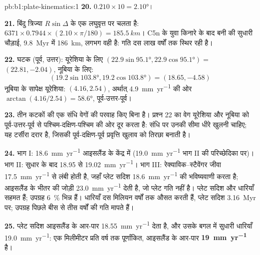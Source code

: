 \begin{solution}{pb:b1:plate-kinematics:1}
\textbf{20.} $0.210\times10 = \ang{2.10}$।

\textbf{21.} बिंदु त्रिज्या $R\sin\Delta$ के एक लघुवृत्त पर चलता है:
$6371\times0.7944\times(2.10\times\pi/180) = \qty{185.5}{km}$। C5n के युवा किनारे के बाद बनी  की सुधारी चौड़ाई, \qty{9.8}{Myr} में \qty{186}{km}, लगभग वही है: गति दस लाख वर्षों तक स्थिर रही है।

\textbf{22.} घटक (पूर्व, उत्तर): यूरेशिया के लिए
$(22.9\sin\ang{95.1}, 22.9\cos\ang{95.1}) =$ $(22.81, -2.04)$, नूबिया के लिए:
\[ (19.2\sin\ang{103.8}, 19.2\cos\ang{103.8}) = (18.65, -4.58) \]
नूबिया के सापेक्ष यूरेशिया: $(4.16, 2.54)$, अर्थात् \qty{4.9}{mm.yr^{-1}} की ओर
$\arctan(4.16/2.54) = \ang{58.6}$, पूर्व-उत्तर-पूर्व।

\textbf{23.} तीन कटकों की एक संधि वेगों की परवाह किए बिना  है। प्रश्न 22 का वेग यूरेशिया और नूबिया को पूर्व-उत्तर-पूर्व से पश्चिम-दक्षिण-पश्चिम की ओर दूर करता है: संधि पर उनकी सीमा धीरे खुलनी चाहिए; यह टर्सीरा दरार है, जिसकी पूर्व-दक्षिण-पूर्व प्रवृत्ति खुलाव को तिरछा बनाती है।

\textbf{24.} भाग I: \qty{18.6}{mm.yr^{-1}} आइसलैंड के केंद्र में
(\qty{19.0}{mm.yr^{-1}} भाग II की परिच्छेदिका पर)। भाग II: सुधार के बाद 18.95 से
\qty{19.02}{mm.yr^{-1}}। भाग III: रेक्याविक–स्टैवेंगर जीवा \qty{17.5}{mm.yr^{-1}} से लंबी होती है, जहाँ प्लेट सदिश \qty{18.6}{mm.yr^{-1}} की भविष्यवाणी करता है; आइसलैंड के भीतर की जोड़ी \qty{23.0}{mm.yr^{-1}} देती है, जो प्लेट गति नहीं है। प्लेट सदिश और धारियाँ सहमत हैं; उपग्रह \qty{6}{\percent} भिन्न हैं। धारियाँ दस मिलियन वर्षों तक औसत करती हैं, प्लेट सदिश \qty{3.16}{Myr} पर; उपग्रह पिछले बीस से तीस वर्षों की गति मापते हैं।

\textbf{25.} प्लेट सदिश आइसलैंड के आर-पार \qty{18.55}{mm.yr^{-1}} देता है, और उसके बगल में सुधारी धारियाँ \qty{19.0}{mm.yr^{-1}}: एक मिलीमीटर प्रति वर्ष तक पूर्णांकित, आइसलैंड के आर-पार 
\textbf{\qty[text-series-to-math=true]{19}{mm.yr^{-1}}} है।
\end{solution}
